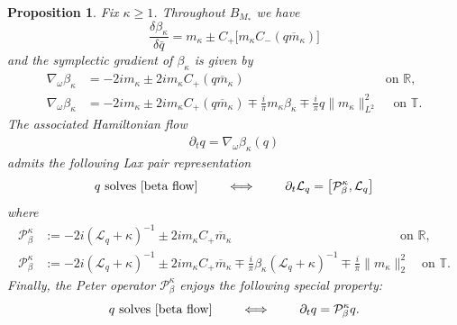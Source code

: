 \documentclass{amsart}
\numberwithin{equation}{section}
\newtheorem{proposition}[theorem]{Proposition}
\theoremstyle{definition}
\newcommand{\dl}{\delta}
\newcommand{\om}{\omega}
\newcommand{\ka}{\kappa}
\newcommand{\R}{\mathbb{R}}
\newcommand{\T}{\mathbb{T}}
\newcommand{\Lc}{\mathcal{L}}
\newcommand{\f}{\frac}
\newcommand{\na}{\nabla}
\newcommand{\dd}{\partial}
\begin{document}
\begin{proposition}\label{lem:beta_results}
Fix $\ka\geq 1$.  Throughout $B_{M_\ast}$ we have
\begin{equation}\label{eqn:beta_deriv}
\f{\dl \beta_\ka}{\dl \bar{q}}=m_\ka\pm C_+\bigl[m_\ka C_-(q\overline m_\ka )\bigr]
\end{equation}
and the symplectic gradient of $\beta_\ka$ is given by
\begin{equation}\label{beta_symplectic_deriv}
\begin{aligned}
\na_\om\beta_\ka&=-2im_\ka\pm 2im_\ka C_+(q\overline m_\ka) \qquad\qquad\qquad\qquad\qquad \quad\,\text{on $\R$,}\\
\na_\om\beta_\ka&=-2im_\ka\pm 2im_\ka C_+(q\overline m_\ka)\mp\tfrac{i}{\pi} m_\ka \beta_\ka\mp\tfrac{i}{\pi}q\|m_\ka \|^2_{L^2} \quad\,\text{on $\T$}.
\end{aligned}
\end{equation}
The associated Hamiltonian flow 
\begin{align}\label{beta flow}
\dd_t q=\na_\om \beta_\ka(q)
\end{align}
admits the following Lax pair representation
\begin{equation}
\text{$q$ solves \eqref{beta flow}} \qquad \iff \qquad \dd_t \Lc_q = \bigl[\mathcal{P}^\ka_\beta,\Lc_q\bigr]\label{beta Lax pair}
\end{equation}
where
\begin{equation}\label{eqn:Peter_op_ka}
\begin{aligned}
\mathcal{P}^\ka_\beta&:=-2i(\Lc_q+\ka)^{-1}\pm 2im_\ka C_+ \overline m_\ka \qquad\qquad\qquad\qquad\qquad\qquad\quad \,\, \text{on $\R$,}\\
\mathcal{P}^\ka_\beta&:=-2i(\Lc_q+\ka)^{-1}\pm 2im_\ka C_+ \overline m_\ka\mp\tfrac{i}{\pi}\beta_\ka(\Lc_q+\ka)^{-1} \mp\tfrac{i}{\pi}\|m_\ka\|_2^2  \quad\text{on $\T$}.
\end{aligned}
\end{equation}
Finally, the Peter operator $\mathcal{P}^\ka_\beta$ enjoys the following special property:
\begin{equation}
\text{$q$ solves \eqref{beta flow}} \qquad \iff \qquad \dd_t q=\mathcal{P}^\ka_\beta q.\label{one true peter}
\end{equation}
\end{proposition}
\end{document}
